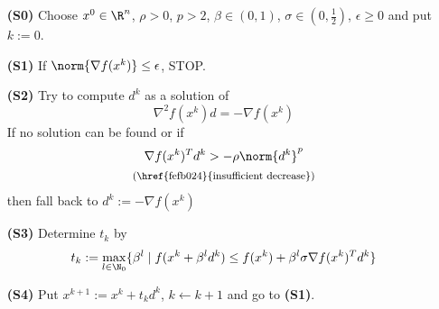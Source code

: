\begin{enumerate}
  \item [\textbf{(S0)}] Choose $x^0\in\R^n$, $\rho>0$, $p>2$, $\beta\in(0,1)$, $\sigma\in(0,\frac12)$, $\epsilon\geq0$ and put $k:=0$.
  \item [\textbf{(S1)}] If $\norm{\nabla f(x^k)}\leq\epsilon$, STOP.
  \item [\textbf{(S2)}] Try to compute $d^k$ as a solution of
        $$\nabla^2f(x^k)d=-\nabla f(x^k)$$
        If no solution can be found or if
        \begin{gather*}
          \nabla f(x^k)^Td^k>-\rho\norm{d^k}^p\\
          \text{\footnotesize{(\href{fefb024}{insufficient decrease})}}
        \end{gather*}
        then fall back to $d^k:=-\nabla f(x^k)$
  \item [\textbf{(S3)}] Determine $t_k$ by
        $$t_k:=\max_{l\in\N_0}\{\beta^l\mid f(x^k+\beta^ld^k)\leq f(x^k)+\beta^l\sigma\nabla f(x^k)^Td^k\}$$
  \item [\textbf{(S4)}] Put $x^{k+1}:=x^k+t_kd^k$, $k\gets k+1$ and go to \textbf{(S1)}.
\end{enumerate}
